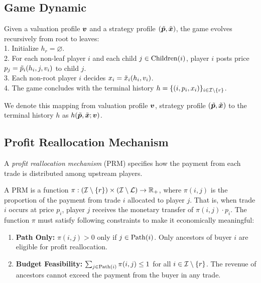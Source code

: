 \subsection{Game Dynamic}
\label{subsec:dynamic}

\begin{definition}
\label{def:game-evolve}
Given a valuation profile ${\bm{v}}$ and a strategy profile $(\tilde{{\bm{p}}}, \tilde{{\bm{x}}})$, the game evolves recursively from root to leaves:\\
1. Initialize $h_r = \varnothing$.\\
2. For each non-leaf player $i$ and each child $j \in \operatorname{Children}(i)$, player $i$ posts price $p_j = \tilde{p}_i(h_i, j, v_i)$ to child $j$.\\
3. Each non-root player $i$ decides $x_i = \tilde{x}_i(h_i, v_i)$.\\
4. The game concludes with the terminal history $h = \{(i, p_i, x_i)\}_{i \in \mathcal{I} \setminus \{r\}}$.
\end{definition}

We denote this mapping from valuation profile ${\bm{v}}$, strategy profile $(\tilde{{\bm{p}}}, \tilde{{\bm{x}}})$ to the terminal history $h$ as $h(\tilde{{\bm{p}}}, \tilde{{\bm{x}}};{\bm{v}})$.


\subsection{Profit Reallocation Mechanism}
\label{subsec:mechanism}

A \emph{profit reallocation mechanism} (PRM) specifies how the payment from each trade is distributed among upstream players.

\begin{definition}
\label{def:prm}
A PRM is a function $\pi: (\mathcal{I} \setminus \{r\}) \times (\mathcal{I} \setminus \mathcal{L}) \to \mathbb{R}_+$, where $\pi(i,j)$ is the proportion of the payment from trade $i$ allocated to player $j$. That is, when trade $i$ occurs at price $p_i$, player $j$ receives the monetary transfer of $\pi(i,j) \cdot p_i$. The function $\pi$ must satisfy following constraints to make it economically meaningful:
\begin{enumerate}[left=0em]
\item \textbf{Path Only:} $\pi(i,j) > 0$ only if $j \in \operatorname{Path}(i)$. Only ancestors of buyer $i$ are eligible for profit reallocation.
\item \textbf{Budget Feasibility:} $\sum_{j \in \operatorname{Path}(i)} \pi(i,j) \le 1$ for all $i \in \mathcal{I} \setminus \{r\}$. The revenue of ancestors cannot exceed the payment from the buyer in any trade.
\end{enumerate}
\end{definition}

